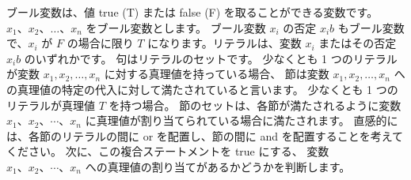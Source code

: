 ブール変数は、値 true (T) または false (F) を取ることができる変数です。 $x_1、x_2、\dots、x_n$ をブール変数とします。 
ブール変数 $x_i$ の否定 $x_i b$ もブール変数で、$x_i$ が $F$ の場合に限り $T$ になります。リテラルは、変数 $x_i$ またはその否定 $x_i b$ のいずれかです。 
句はリテラルのセットです。 少なくとも 1 つのリテラルが変数 $x_1, x_2, \dots, x_n$ に対する真理値を持っている場合、
節は変数 $x_1, x_2, \dots, x_n$ への真理値の特定の代入に対して満たされていると言います。 少なくとも 1 つのリテラルが真理値 $T$ を持つ場合。
節のセットは、各節が満たされるように変数 $x_1、x_2、\cdots、x_n$ に真理値が割り当てられている場合に満たされます。 
直感的には、各節のリテラルの間に or を配置し、節の間に and を配置することを考えてください。 次に、この複合ステートメントを true にする、
変数 $x_1、x_2、\cdots、x_n$ への真理値の割り当てがあるかどうかを判断します。